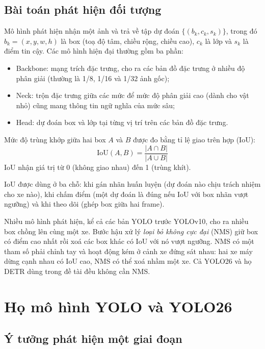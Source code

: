 \subsection{Bài toán phát hiện đối tượng}

Mô hình phát hiện nhận một ảnh và trả về tập dự đoán $\{(b_k, c_k, s_k)\}$, trong đó $b_k = (x, y, w, h)$ là box (toạ độ
tâm, chiều rộng, chiều cao), $c_k$ là lớp và $s_k$ là điểm tin cậy. Các mô hình hiện đại thường gồm ba phần:
\begin{itemize}
  \item Backbone: mạng trích đặc trưng, cho ra các bản đồ đặc trưng ở nhiều độ phân giải (thường là 1/8, 1/16 và
        1/32 ảnh gốc);
  \item Neck: trộn đặc trưng giữa các mức để mức độ phân giải cao (dành cho vật nhỏ) cũng mang thông tin ngữ
        nghĩa của mức sâu;
  \item Head: dự đoán box và lớp tại từng vị trí trên các bản đồ đặc trưng.
\end{itemize}

Mức độ trùng khớp giữa hai box $A$ và $B$ được đo bằng tỉ lệ giao trên hợp (IoU):
\begin{equation}
  \mathrm{IoU}(A, B) = \frac{|A \cap B|}{|A \cup B|}
  \label{eq:iou}
\end{equation}
IoU nhận giá trị từ 0 (không giao nhau) đến 1 (trùng khít).

IoU được dùng ở ba chỗ: khi gán nhãn huấn luyện (dự đoán nào chịu trách nhiệm cho xe nào), khi chấm điểm (một dự đoán
là đúng nếu IoU với box nhãn vượt ngưỡng) và khi theo dõi (ghép box giữa hai frame).

Nhiều mô hình phát hiện, kể cả các bản YOLO trước YOLOv10, cho ra nhiều box chồng lên cùng một xe. Bước hậu xử lý
\emph{loại bỏ không cực đại} (NMS) giữ box có điểm cao nhất rồi xoá các box khác có IoU với nó vượt ngưỡng. NMS có
một tham số phải chỉnh tay và hoạt động kém ở cảnh xe đứng sát nhau: hai xe máy dừng cạnh nhau có IoU cao, NMS có thể
xoá nhầm một xe. Cả YOLO26 và họ DETR dùng trong đề tài đều không cần NMS.

\section{Họ mô hình YOLO và YOLO26}

\subsection{Ý tưởng phát hiện một giai đoạn}

